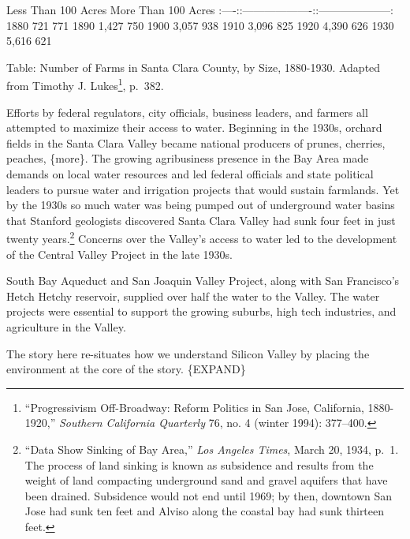 \documentclass[11pt,article,oneside]{memoir}
\begin{document}
\textbar{} \textbar{} Less Than 100 Acres \textbar{} More Than 100 Acres
\textbar{}
\textbar{}:----:\textbar{}:-------------------:\textbar{}:--------------------:\textbar{}
\textbar{} 1880 \textbar{} 721 \textbar{} 771 \textbar{} \textbar{} 1890
\textbar{} 1,427 \textbar{} 750 \textbar{} \textbar{} 1900 \textbar{}
3,057 \textbar{} 938 \textbar{} \textbar{} 1910 \textbar{} 3,096
\textbar{} 825 \textbar{} \textbar{} 1920 \textbar{} 4,390 \textbar{}
626 \textbar{} \textbar{} 1930 \textbar{} 5,616 \textbar{} 621
\textbar{}

Table: Number of Farms in Santa Clara County, by Size, 1880-1930.
Adapted from Timothy J. Lukes\footnote{``Progressivism Off-Broadway:
  Reform Politics in San Jose, California, 1880-1920,'' \emph{Southern
  California Quarterly} 76, no. 4 (winter 1994): 377--400.}, p.~382.

Efforts by federal regulators, city officials, business leaders, and
farmers all attempted to maximize their access to water. Beginning in
the 1930s, orchard fields in the Santa Clara Valley became national
producers of prunes, cherries, peaches, \{more\}. The growing
agribusiness presence in the Bay Area made demands on local water
resources and led federal officials and state political leaders to
pursue water and irrigation projects that would sustain farmlands. Yet
by the 1930s so much water was being pumped out of underground water
basins that Stanford geologists discovered Santa Clara Valley had sunk
four feet in just twenty years.\footnote{``Data Show Sinking of Bay
  Area,'' \emph{Los Angeles Times}, March 20, 1934, p.~1. The process of
  land sinking is known as subsidence and results from the weight of
  land compacting underground sand and gravel aquifers that have been
  drained. Subsidence would not end until 1969; by then, downtown San
  Jose had sunk ten feet and Alviso along the coastal bay had sunk
  thirteen feet.} Concerns over the Valley's access to water led to the
development of the Central Valley Project in the late 1930s.

South Bay Aqueduct and San Joaquin Valley Project, along with San
Francisco's Hetch Hetchy reservoir, supplied over half the water to the
Valley. The water projects were essential to support the growing
suburbs, high tech industries, and agriculture in the Valley.

The story here re-situates how we understand Silicon Valley by placing
the environment at the core of the story. \{EXPAND\}
\end{document}
